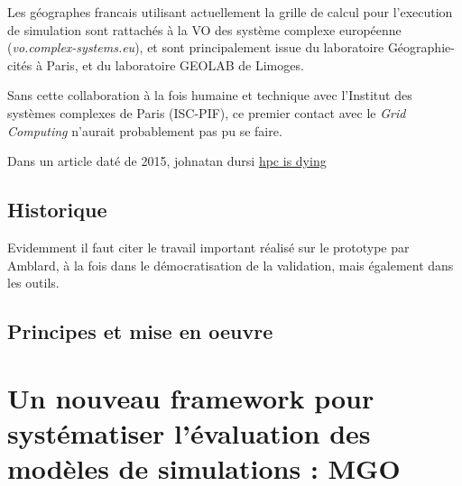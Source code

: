 Les géographes francais utilisant actuellement la grille de calcul pour l'execution de simulation sont rattachés à la VO des système complexe européenne (\textit{vo.complex-systems.eu}), et sont principalement issue du laboratoire Géographie-cités à Paris, et du laboratoire GEOLAB de Limoges.

Sans cette collaboration à la fois humaine et technique avec l'Institut des systèmes complexes de Paris (ISC-PIF), ce premier contact avec le \textit{Grid Computing} n'aurait probablement pas pu se faire.


Dans un article daté de 2015, johnatan dursi
\href{http://www.dursi.ca/hpc-is-dying-and-mpi-is-killing-it/}{hpc is dying}

\subsection{Historique}

Evidemment il faut citer le travail important réalisé sur le prototype par Amblard, à la fois dans le démocratisation de la validation, mais également dans les outils.

\subsection{Principes et mise en oeuvre}

\section{Un nouveau framework pour systématiser l'évaluation des modèles de simulations : MGO}
\label{sec:MGO}


